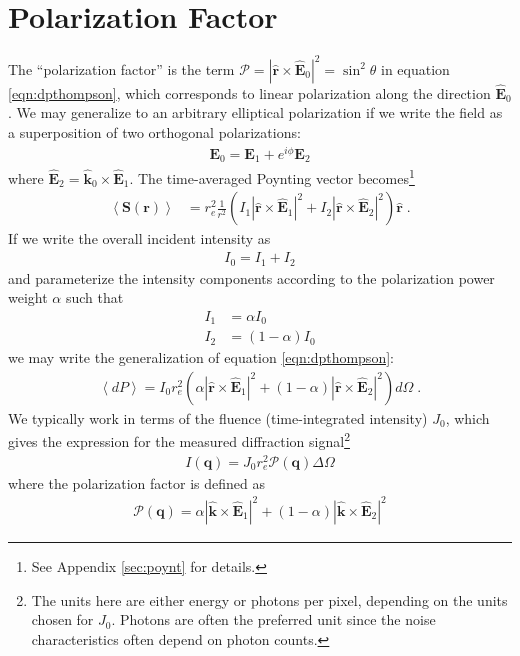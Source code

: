 \documentclass[12pt]{article}
\renewcommand{\vec}[1]{\boldsymbol{#1}}
\newcommand{\hvec}[1]{\hat{\vec{#1}}}
\newcommand{\avg}[1]{\left\langle #1 \right\rangle}
\begin{document}
\section{Polarization Factor}

The ``polarization factor'' is the term $\mathcal{P}=| \hvec{r} 
\times  \hvec{E}_0 |^2=\sin^2\theta$ in equation \ref{eqn:dpthompson}, which
corresponds to linear polarization along the direction $\hvec{E}_0$.  We may 
generalize to an arbitrary elliptical polarization if we write the field as a 
superposition of two orthogonal polarizations:
\begin{align}
 \vec{E}_0 = \vec{E}_1 + e^{i\phi}\vec{E}_2 
\end{align}
where $\hvec{E}_2 = \hvec{k}_0 \times \hvec{E}_1$.  The time-averaged Poynting 
vector becomes\footnote{See Appendix \ref{sec:poynt} for details.}
\begin{align}
\avg{\vec{S}(\vec{r})} &= r_e^2 \frac{1}{r^2} (I_1 | \hvec{r} \times  \hvec{E}_1 
|^2 + I_2 | \hvec{r} \times  \hvec{E}_2 |^2)  \hvec{r} \;. 
\end{align}
If we write the overall incident intensity as 
\begin{align}
 I_0 = I_1 + I_2 
\end{align}
and parameterize the intensity components according to the polarization 
power weight $\alpha$ such that
\begin{align}
 I_1 &=\alpha I_0\\
 I_2 &= (1-\alpha)I_0
\end{align}
we may write the generalization of equation \ref{eqn:dpthompson}:
\begin{align}\label{eqn:genthompson}
\avg{dP} = I_0 r_e^2  (\alpha | \hvec{r} \times  \hvec{E}_1 |^2 + (1-\alpha) 
| \hvec{r} \times  \hvec{E}_2 |^2)  d\Omega\;.
\end{align}
We typically work in terms of the fluence (time-integrated intensity) $J_0$, 
which gives the expression for the measured diffraction signal\footnote{The 
units here are either energy or photons per pixel, depending on the units 
chosen for $J_0$.  Photons are often the preferred unit since the noise 
characteristics often depend on photon counts.}
\begin{align}\label{eqn:keyF}
    I(\vec{q}) = J_0 r_e^2  \mathcal{P}(\vec{q}) \Delta \Omega
\end{align}
where the polarization factor is defined as
\begin{align}\label{eqn:goodpol}
 \mathcal{P}(\vec{q}) = \alpha | \hvec{k} \times  \hvec{E}_1 |^2 + (1-\alpha) | 
\hvec{k} \times \hvec{E}_2 |^2
\end{align}
\end{document}
